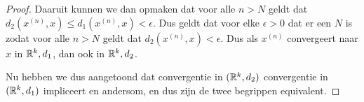 \begin{proof}
    Daaruit kunnen we dan opmaken dat voor alle \(n>N\) geldt dat \(d_{2}(x^{(n)},x)\leq d_{1}(x^{(n)},x)<\epsilon\). Dus geldt dat voor elke \(\epsilon>0\) dat er een \(N\) is zodat voor alle \(n>N\) geldt dat \(d_{2}(x^{(n)},x)<\epsilon\). Dus als \(x^{(n)}\) convergeert naar \(x\) in \(\mathbb{R}^{k},d_{1}\), dan ook in \(\mathbb{R}^{k},d_{2}\).

    Nu hebben we dus aangetoond dat convergentie in \((\mathbb{R}^{k},d_{2})\) convergentie in \((\mathbb{R}^{k},d_{1})\) impliceert en andersom, en dus zijn de twee begrippen equivalent. 
\end{proof}

